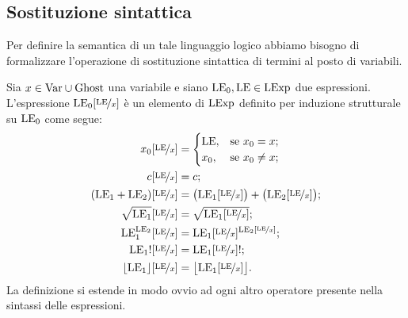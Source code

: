 \subsection{Sostituzione sintattica}
Per definire la semantica di un tale linguaggio logico abbiamo bisogno
di formalizzare l'operazione di sostituzione sintattica di termini
al posto di variabili.

\begin{definizione} 
Sia $x \in \mathrm{Var} \cup \mathrm{Ghost}$ una variabile e siano $\mathrm{LE}_0, \mathrm{LE} \in \mathrm{LExp}$
due espressioni.
L'espressione $\mathrm{LE}_0[\nicefrac{\mathrm{LE}}{x}]$ è un elemento di $\mathrm{LExp}$ definito
per induzione strutturale su $\mathrm{LE}_0$ come segue:
\begin{align*}
   x_0[\nicefrac{\mathrm{LE}}{x}]
    &=
      \begin{cases}
        \mathrm{LE}, &\text{se $x_0 = x$;} \\
        x_0, &\text{se $x_0 \neq x$;}
      \end{cases} \\
   c[\nicefrac{\mathrm{LE}}{x}]
    &= c;\\
  (\mathrm{LE}_1 + \mathrm{LE}_2)[\nicefrac{\mathrm{LE}}{x}]
     &= \bigl(\mathrm{LE}_1[\nicefrac{\mathrm{LE}}{x}]\bigr) + \bigl(\mathrm{LE}_2[\nicefrac{\mathrm{LE}}{x}]\bigr);\\
  \sqrt{\mathrm{LE}_1}[\nicefrac{\mathrm{LE}}{x}]
     &= \sqrt{{\mathrm{LE}_1}[\nicefrac{\mathrm{LE}}{x}]};\\
  \mathrm{LE}_1^{\mathrm{LE}_2}[\nicefrac{\mathrm{LE}}{x}]
     &= \mathrm{LE}_1[\nicefrac{\mathrm{LE}}{x}]^{\mathrm{LE}_2[\nicefrac{\mathrm{LE}}{x}]};\\
  {\mathrm{LE}_1}![\nicefrac{\mathrm{LE}}{x}]
     &= {{\mathrm{LE}_1}[\nicefrac{\mathrm{LE}}{x}]}!;\\
  \lfloor \mathrm{LE}_1 \rfloor[\nicefrac{\mathrm{LE}}{x}]
     &= \bigl\lfloor \mathrm{LE}_1[\nicefrac{\mathrm{LE}}{x}] \bigr\rfloor.\\
\end{align*}
La definizione si estende in modo ovvio ad ogni altro operatore presente
nella sintassi delle espressioni.
\end{definizione}

